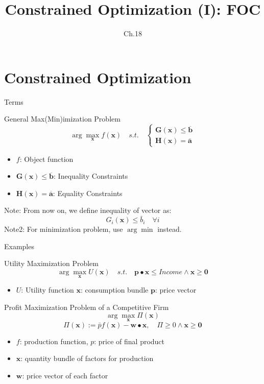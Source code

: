 \documentclass[a4paper,11pt]{article}
\author[조남운]{\mail}
\title{Constrained Optimization (I): FOC}
\subtitle{Ch.18}
\newcommand{\bd}{\mathbf}
\begin{document}
\maketitle


\section{Constrained Optimization} %
\label{sec:constrained_optimization}
\begin{frame}[t]{Terms}
	\begin{block}
		{General Max(Min)imization Problem}
		\[
			\arg\max_{\bd{x}} f(\bd{x})\quad s.t.\quad \begin{cases}
				\bd{G}(\bd{x})\le\overline{\bd{b}}\\
				\bd{H}(\bd{x})=\overline{\bd{a}}
			\end{cases}
		\]
		\begin{itemize}
			\item $f$: Object function
			\item $\bd{G}(\bd{x})\le\overline{\bd{b}}$: Inequality Constraints
			\item $\bd{H}(\bd{x})=\overline{\bd{a}}$: Equality Constraints
		\end{itemize}
	\end{block}
	Note: From now on, we define inequality of vector as:\[
		G_i(\bd{x}) \le \bar{b}_i\quad \forall i
	\]
	Note2: For minimization problem, use $\arg\min$ instead.
\end{frame}
\begin{frame}[t]{Examples}
	\begin{block}
		{Utility Maximization Problem}
		\[
			\arg\max_{\bd{x}} U(\bd{x})\quad s.t. \quad \bd{p}\bullet \bd{x} \le Income \land \bd{x}\ge \bd{0}
		\]
		\begin{itemize}
			\item $U$: Utility function $\bd{x}$: consumption bundle $\bd{p}$: price vector
		\end{itemize}
	\end{block}
	\begin{block}
		{Profit Maximization Problem of a Competitive Firm}
		\[
			\arg\max_{\bd{x}} \Pi(\bd{x})
		\]\[
			\Pi(\bd{x}) := \bar p f(\bd{x}) - \bd{w}\bullet\bd{x},\quad \Pi\ge 0 \land \bd{x}\ge \bd{0}
		\]
		\begin{itemize}
			\item $f$: production function, $p$: price of final product
			\item $\bd{x}$: quantity bundle of factors for production
			\item $\bd{w}$: price vector of each factor
		\end{itemize}
	\end{block}
\end{frame}
\end{document}
